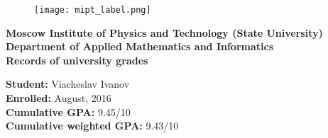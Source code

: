 \documentclass[11pt, a4paper]{report}
\begin{document}
\begin{multicols}{2}
	\begin{figure}[H]
		\begin{center}
			\texttt{[image: mipt\_label.png]}
		\end{center}
	\end{figure}
	\columnbreak
	\begin{center}
		\null \vfill
		\textbf{Moscow Institute of Physics and Technology (State University)\\Department of Applied Mathematics and Informatics\\Records of university grades}
		\vfill \null
	\end{center}
\end{multicols}
\textbf{Student:} Viacheslav Ivanov\\
\textbf{Enrolled:} August, 2016\\
\textbf{Cumulative GPA:} 9.45/10\\
\textbf{Cumulative weighted GPA:} 9.43/10\\
\end{document}
